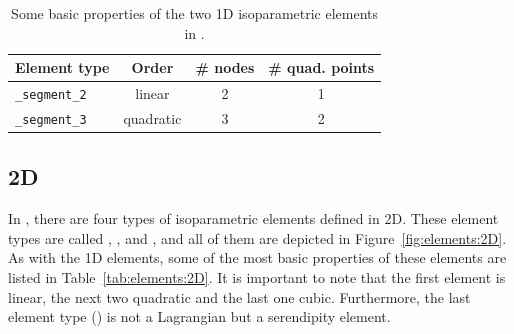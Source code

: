 \begin{table}[!htb]
\begin{center}
\begin{tabular}{l|ccc}
\toprule
Element type & Order & \# nodes & \# quad. points \\
\midrule
\texttt{\_segment\_2} & linear & 2 & 1 \\
\texttt{\_segment\_3} & quadratic & 3 & 2 \\
\bottomrule
\end{tabular}
\end{center}
\caption{Some basic properties of the two 1D isoparametric elements in \akantu.}
\label{tab:elements:1D}
\end{table}

\subsection*{2D}

In \akantu, there are four types of isoparametric elements defined in 2D. These element types are called , ,  and , and all of them are depicted in Figure~\ref{fig:elements:2D}. As with the 1D elements, some of the most basic properties of these elements are listed in Table~\ref{tab:elements:2D}. It is important to note that the first element is linear, the next two quadratic and the last one cubic. Furthermore, the last element type () is not a Lagrangian but a serendipity element.

